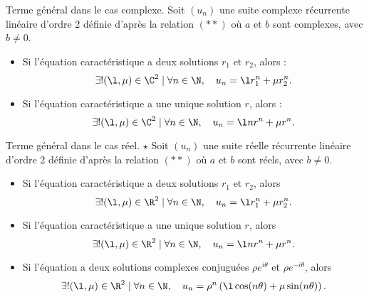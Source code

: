 \documentclass[11pt]{article}
\begin{document}
\begin{prop}{Terme général dans le cas complexe.}{}
    Soit $(u_n)$ une suite complexe récurrente linéaire d'ordre 2 définie d'après la relation $(**)$ où $a$ et $b$ sont complexes, avec $b\neq 0$.
    \begin{itemize}
        \item Si l'équation caractéristique a deux solutions $r_1$ et $r_2$, alors :
        \begin{equation*}
            \exists!(\l,\mu)\in\C^2 \mid \forall n \in \N, \quad u_n = \l r_1^n + \mu r_2^n.
        \end{equation*}
        \item Si l'équation caractéristique a une unique solution $r$, alors :
        \begin{equation*}
            \exists!(\l,\mu)\in\C^2 \mid \forall n \in \N, \quad u_n = \l nr^n + \mu r^n.
        \end{equation*}
    \end{itemize}
\end{prop}

\begin{prop}{Terme général dans le cas réel. $\star$}{}
    Soit $(u_n)$ une suite réelle récurrente linéaire d'ordre 2 définie d'après la relation $(**)$ où $a$ et $b$ sont réels, avec $b\neq0$.
    \begin{itemize}
        \item Si l'équation caractéristique a deux solutions $r_1$ et $r_2$, alors
        \begin{equation*}
            \exists!(\l,\mu)\in\R^2 \mid \forall n \in \N, \quad u_n = \l r_1^n + \mu r_2^n.
        \end{equation*}
        \item Si l'équation caractéristique a une unique solution $r$, alors
        \begin{equation*}
            \exists!(\l,\mu)\in\R^2 \mid \forall n \in \N, \quad u_n = \l nr^n + \mu r^n.
        \end{equation*}
        \item Si l'équation a deux solutions complexes conjuguées $\rho e^{i\theta}$ et $\rho e^{-i\theta}$, alors
        \begin{equation*}
            \exists!(\l,\mu)\in\R^2 \mid \forall n \in \N, \quad u_n = \rho^n\left(\l\cos(n\theta) + \mu\sin(n\theta)\right).
        \end{equation*}
    \end{itemize}
\end{prop}
\end{document}
